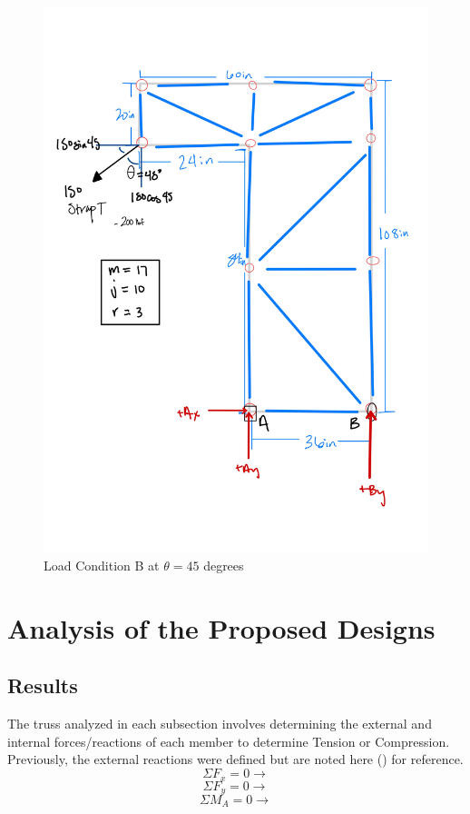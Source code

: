\begin{figure}
\centering
\includegraphics[width=\textwidth]{con3_lcb.jpg}
\caption{Load Condition B at $\theta = 45$ degrees}
\end{figure}
\chapter{Analysis of the Proposed Designs}
\section{Results}
	The truss analyzed in each subsection involves determining the external and internal forces/reactions of each member to determine Tension or Compression. Previously, the external reactions were defined but are noted here () for reference.
$$ \Sigma F_x = 0 \longrightarrow $$
$$ \Sigma F_y = 0 \longrightarrow $$ $$ \Sigma M_A = 0 \longrightarrow $$
    
